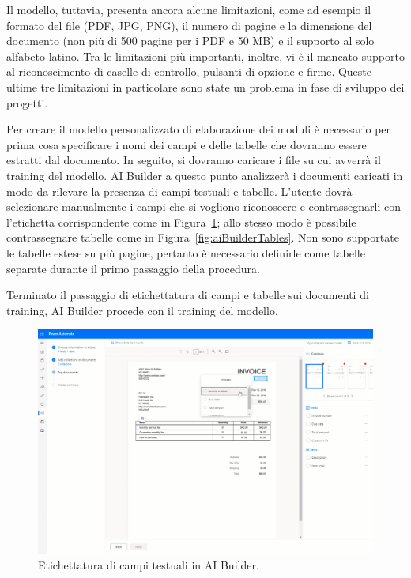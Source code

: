 Il modello, tuttavia, presenta ancora alcune limitazioni, come ad esempio il formato del file (PDF, JPG, PNG), il numero di pagine  e la dimensione del documento (non più di 500 pagine per i PDF e 50 MB) e il supporto al solo alfabeto latino.
Tra le limitazioni più importanti, inoltre, vi è il mancato supporto al riconoscimento di caselle di controllo, pulsanti di opzione e firme. Queste ultime tre limitazioni in particolare sono state un problema in fase di sviluppo dei progetti.

Per creare il modello personalizzato di elaborazione dei moduli è necessario per prima cosa specificare i nomi dei campi e delle tabelle che dovranno essere estratti dal documento.
In seguito, si dovranno caricare i file su cui avverrà il training del modello. AI Builder a questo punto analizzerà i documenti caricati in modo da rilevare la presenza di campi testuali e tabelle.
L'utente dovrà  selezionare manualmente i campi che si vogliono riconoscere e contrassegnarli con l'etichetta corrispondente come in Figura~\ref{fig:aiBuilderFields}; allo stesso modo è possibile contrassegnare tabelle come in Figura~\ref{fig:aiBuilderTables}. Non sono supportate le tabelle estese su più pagine, pertanto è necessario definirle come tabelle separate durante il primo passaggio della procedura.

Terminato il passaggio di etichettatura di campi e tabelle sui documenti di training, AI Builder procede con il training del modello.

\begin{figure}[ht]
  \centering
  \includegraphics[width=\textwidth]{ai-builder-fields.png}
  \caption{Etichettatura di campi testuali in AI Builder.}
  \label{fig:aiBuilderFields}
\end{figure}

